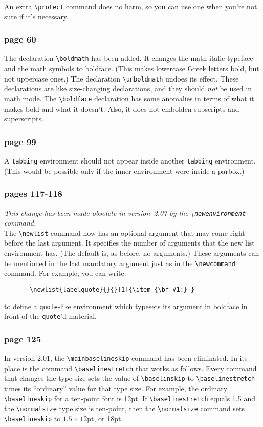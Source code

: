 An extra \hbox{\verb"\protect"} command does no harm, so you can use
one when you're not sure if it's necessary.

\subsubsection*{page 60}
The declaration \hbox{\verb"\boldmath"} has been added.  It changes
the math italic typeface and the math symbols to boldface.  (This
makes lowercase Greek letters bold, but not uppercase ones.)  The
declaration \hbox{\verb"\unboldmath"} undoes its effect.  These
declarations are like size-changing declarations, and they should {\it
not\/} be used in math mode.  The \hbox{\verb"\boldface"} declaration
has some anomalies in terms of what it makes bold and what it
doesn't.  Also, it does not embolden subscripts and superscripts.

\subsubsection*{page 99}
A \hbox{\tt tabbing} environment should not appear inside
another \hbox{\tt tabbing} environment.  (This would
be possible only if the inner environment were inside a
parbox.)

\subsubsection*{pages 117-118}
{\it This change has been made obsolete in version~2.07 by the
\hbox{\verb"\newenvironment"} command.}\\
The \hbox{\verb"\newlist"} command now has an optional argument that
may come right before the last argument.  It specifies the number of
arguments that the new list environment has.  (The default is, as
before, no arguments.)  These arguments can be mentioned in the last
mandatory argument just as in the 
\hbox{\verb"\newcommand"} command.  For example,
you can write:
\begin{verbatim}
       \newlist{labelquote}{}{}[1]{\item {\bf #1:} }
\end{verbatim}
to define a \hbox{\tt quote}-like environment which typesets its
argument in boldface in front of the \hbox{\tt quote}'d material.

\subsubsection* {page 125} 
In \LATEX{} version 2.01, the \hbox{\verb"\mainbaselineskip"} command
has been eliminated.  In its place is the command
\hbox{\verb"\baselinestretch"} that works as follows.  Every command
that changes the type size sets the value of
\hbox{\verb"\baselinskip"} to \hbox{\verb"\baselinestretch"} times its
``ordinary'' value for that type size.  For example, the ordinary
\hbox{\verb"\baselineskip"} for a ten-point font is 12pt.  If
\hbox{\verb"\baselinestretch"} equals 1.5 and the
\hbox{\verb"\normalsize"} type size is ten-point, then the
\hbox{\verb"\normalsize"} command sets \hbox{\verb"\baselineskip"} to
$1.5\times 12$pt, or 18pt.


